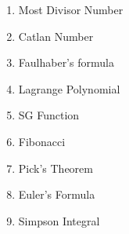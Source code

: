 

\begin{enumerate}[leftmargin=3em]
    \normalsize \item Most Divisor Number \par
        \tiny 
    \normalsize \item Catlan Number \par
        \tiny 
    \normalsize \item Faulhaber's formula \par
        \tiny 
    \normalsize \item Lagrange Polynomial \par
        \tiny 
    \normalsize \item SG Function \par
        \tiny 
    \normalsize \item Fibonacci \par
        \tiny 
    \normalsize \item Pick's Theorem \par
        \tiny 
    \normalsize \item Euler's Formula \par
        \tiny 
    \normalsize \item Simpson Integral \par
        \tiny 
\end{enumerate}